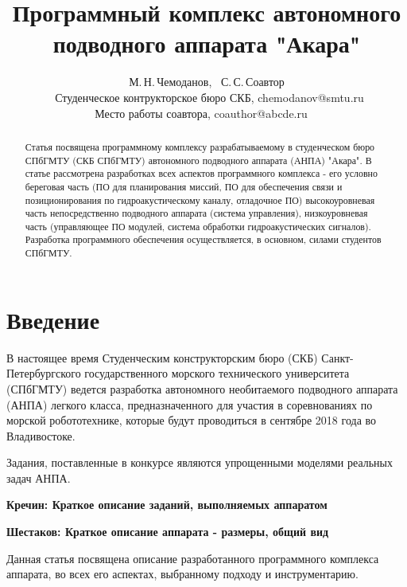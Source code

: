 \title{\bft Программный комплекс автономного подводного аппарата "Акара"}
\author{М.\,Н.\,Чемоданов\footnotemark[1],~
	С.\,С.\,Соавтор\footnotemark[2]\\[2mm]
	\footnotemark[1]~{Студенческое контрукторское бюро СКБ, chemodanov@smtu.ru}\\
	\footnotemark[2]~{Место работы соавтора, coauthor@abcde.ru}~~~}


\maketitle

\begin{abstract}
	Статья посвящена программному комплексу разрабатываемому в студенческом бюро СПбГМТУ (СКБ СПбГМТУ) автономного подводного аппарата (АНПА) "Акара". В статье рассмотрена разработках всех аспектов программного комплекса - его условно береговая часть (ПО для планирования миссий, ПО для обеспечения связи и позиционирования по гидроакустическому каналу, отладочное ПО) высокоуровневая часть непосредственно подводного аппарата (система управления), низкоуровневая часть (управляющее ПО модулей, система обработки гидроакустических сигналов). Разработка программного обеспечения осуществляется, в основном, силами студентов СПбГМТУ. 
\end{abstract}

\section{Введение}


В настоящее время Студенческим конструкторским бюро (СКБ) Санкт-Петербургского государственного морского технического университета (СПбГМТУ) ведется разработка автономного необитаемого подводного аппарата (АНПА) легкого класса, предназначенного для участия в соревнованиях по морской робототехнике, которые будут проводиться в сентябре 2018 года во Владивостоке\cite{AuvCompetition}.

Задания, поставленные в конкурсе являются упрощенными моделями реальных задач АНПА.

\textbf{Кречин: Краткое описание заданий, выполняемых аппаратом}

\textbf{Шестаков: Краткое описание аппарата - размеры, общий вид}

Данная статья посвящена описание разработанного программного комплекса аппарата, во всех его аспектах, выбранному подходу и инструментарию.


